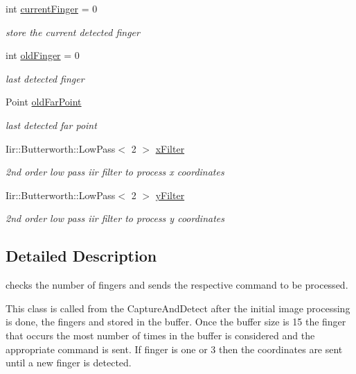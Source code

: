 \begin{DoxyCompactItemize}
int \hyperlink{class_gesture_detection_1_1_finger_counter_a8d7f597b3c452bdd4d418752eaa616cb}{current\+Finger} = 0
\begin{DoxyCompactList}\small\item\em store the current detected finger \end{DoxyCompactList}\item 
int \hyperlink{class_gesture_detection_1_1_finger_counter_a85ab77987a3933bf0b719cf13751060d}{old\+Finger} = 0
\begin{DoxyCompactList}\small\item\em last detected finger \end{DoxyCompactList}\item 
Point \hyperlink{class_gesture_detection_1_1_finger_counter_a84c41c1ed2f5c6c76031690664c5efc4}{old\+Far\+Point}
\begin{DoxyCompactList}\small\item\em last detected far point \end{DoxyCompactList}\item 
Iir\+::\+Butterworth\+::\+Low\+Pass$<$ 2 $>$ \hyperlink{class_gesture_detection_1_1_finger_counter_a4c922ffcb1a2b6232fc2d7715c523c09}{x\+Filter}
\begin{DoxyCompactList}\small\item\em 2nd order low pass iir filter to process x coordinates \end{DoxyCompactList}\item 
Iir\+::\+Butterworth\+::\+Low\+Pass$<$ 2 $>$ \hyperlink{class_gesture_detection_1_1_finger_counter_aaafad0b89fe35e79247270c24988da05}{y\+Filter}
\begin{DoxyCompactList}\small\item\em 2nd order low pass iir filter to process y coordinates \end{DoxyCompactList}\end{DoxyCompactItemize}


\subsection{Detailed Description}
checks the number of fingers and sends the respective command to be processed. 

This class is called from the Capture\+And\+Detect after the initial image processing is done, the fingers and stored in the buffer. Once the buffer size is 15 the finger that occurs the most number of times in the buffer is considered and the appropriate command is sent. If finger is one or 3 then the coordinates are sent until a new finger is detected. 

